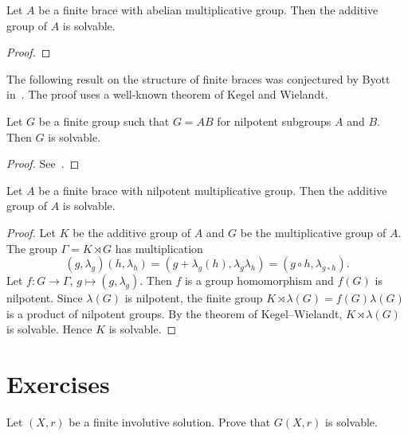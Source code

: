 


\begin{theorem}
Let $A$ be a finite brace with abelian multiplicative group. Then 
the additive group of $A$ is solvable.
\end{theorem}

\begin{proof}
    
\end{proof}

The following result on the structure of finite braces was
conjectured by Byott in~\cite{MR3425626}. The proof 
uses a well-known theorem of Kegel and Wielandt.

\begin{theorem}
    Let $G$ be a finite group such that $G=AB$ for nilpotent subgroups $A$ and $B$. Then $G$ is solvable. 
\end{theorem}

\begin{proof}
    See~\cite[Theorem 2.4.3]{MR1211633}.
\end{proof}

\begin{theorem}
\label{thm:mul_nilpotent}
Let $A$ be a finite brace with nilpotent multiplicative group. Then 
the additive group of $A$ is solvable.
\end{theorem}

\begin{proof}
    Let $K$ be the additive group of $A$ and $G$ be the multiplicative group of $A$. The group
    $\Gamma=K\rtimes G$ has multiplication
    \[
    (g,\lambda_g)(h,\lambda_h)=(g+\lambda_g(h),\lambda_g\lambda_h)=(g\circ h,\lambda_{g\circ h}).
    \]
    Let $f\colon G\to\Gamma$, $g\mapsto(g,\lambda_g)$. 
    Then $f$ is a group homomorphism and $f(G)$ is nilpotent. 
    Since $\lambda(G)$ is nilpotent, the finite group 
    $K\rtimes\lambda(G)=f(G)\lambda(G)$ is a product of nilpotent groups. 
    By the theorem of Kegel--Wielandt, $K\rtimes\lambda(G)$ is solvable. Hence $K$ is solvable. 
\end{proof}

\section*{Exercises}

\begin{prob}
\label{prob:G(X,r)solvable}
Let $(X,r)$ be a finite involutive solution. Prove that $G(X,r)$ is solvable. 
\end{prob}

